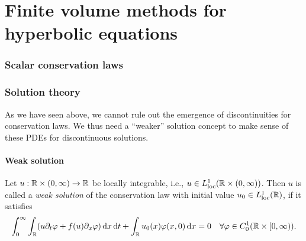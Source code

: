 \part{Finite volume methods for hyperbolic equations}


\section*{Scalar conservation laws}

\begin{remark}
	
\end{remark}


\section{Solution theory}

As we have seen above, we cannot rule out the emergence of discontinuities for conservation laws. We thus need a ``weaker'' solution concept to make sense of these PDEs for discontinuous solutions.


\subsection{Weak solution}

\begin{definition}
	Let \(u: \R \times \parentheses*{0, \infty} \to \R\) be locally integrable, i.e., \(u \in L_{\text{loc}}^1\parentheses*{\R \times \parentheses*{0, \infty}}\).
	Then \(u\) is called a \emph{weak solution} of the conservation law with initial value \(u_0 \in L_{\text{loc}}^1\parentheses*{\R}\), if it satisfies
	\[
		\int_0^\infty \int_\R \parentheses*{u\partial_t \varphi + f\parentheses*{u}\partial_x \varphi}\d x\d t + \int_\R u_0\parentheses*{x}\varphi\parentheses*{x, 0}\d x = 0 \quad \forall \varphi \in C_0^1\parentheses*{\R \times \left[0, \infty\right)}.
	\]
\end{definition}

